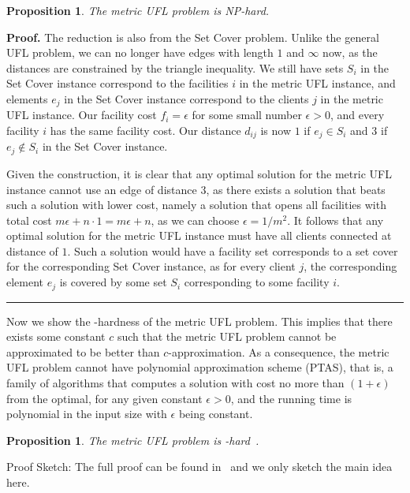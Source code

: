 \documentclass[oneside,final]{ucr}
\newtheorem{proposition}[theorem]{Proposition}
\newenvironment{proof}[1][Proof]{\textbf{#1.} }{\ \rule{0.5em}{0.5em}}
\begin{document}
\begin{proposition} \label{prop:metricNP}
  The metric UFL problem is NP-hard.
\end{proposition}
\begin{proof}
  The reduction is also from the Set Cover problem. Unlike
  the general UFL problem, we can no longer have edges with
  length $1$ and $\infty$ now, as the distances are
  constrained by the triangle inequality. We still have sets
  $S_i$ in the Set Cover instance correspond to the
  facilities $i$ in the metric UFL instance, and elements
  $e_j$ in the Set Cover instance correspond to the clients
  $j$ in the metric UFL instance. Our facility cost $f_i =
  \epsilon$ for some small number $\epsilon > 0$, and every
  facility $i$ has the same facility cost. Our distance
  $d_{ij}$ is now $1$ if $e_j \in S_i$ and $3$ if $e_j
  \notin S_i$ in the Set Cover instance.

  Given the construction, it is clear that any optimal
  solution for the metric UFL instance cannot use an edge of
  distance $3$, as there exists a solution that beats such a
  solution with lower cost, namely a solution that opens all
  facilities with total cost $m\epsilon + n\cdot 1 =
  m\epsilon + n$, as we can choose $\epsilon = 1/m^2$. It
  follows that any optimal solution for the metric UFL
  instance must have all clients connected at distance of
  $1$. Such a solution would have a facility set corresponds
  to a set cover for the corresponding Set Cover instance,
  as for every client $j$, the corresponding element $e_j$
  is covered by some set $S_i$ corresponding to some
  facility $i$.
\end{proof}

Now we show the {\MaxSNP}-hardness of the metric UFL
problem. This implies that there exists some constant $c$
such that the metric UFL problem cannot be approximated to
be better than $c$-approximation. As a consequence, the
metric UFL problem cannot have polynomial approximation
scheme (PTAS), that is, a family of algorithms that computes
a solution with cost no more than $(1+\epsilon)$ from the
optimal, for any given constant $\epsilon > 0$, and the
running time is polynomial in the input size with $\epsilon$
being constant.

\begin{proposition}\label{prop:maxsnp}
  The metric UFL problem is {\MaxSNP}-hard~{\mbox{\rm \cite{GuhaK98}}}.
\end{proposition}
  Proof Sketch: The full proof can be found
  in~\cite{GuhaK98} and we only sketch the main idea here.
\end{document}
